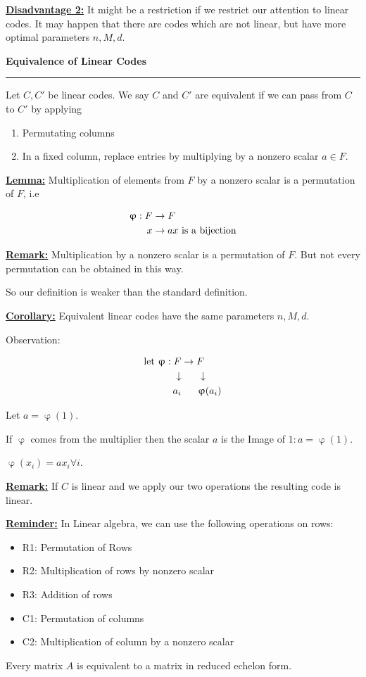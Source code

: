 \documentclass{article}
\newcommand{\header}[1]{
	\begin{Large}
	\noindent\textbf{#1}
	\vspace{2pt}
	\hrule
	\vspace{16pt}
	\end{Large}
	\normalsize
}
\renewcommand{\b}[1]{\textbf{#1}}
\newcommand{\ul}[1]{\underline{#1}}
\renewcommand{\aligned}[1]{
	\begin{align*}
		#1
	\end{align*}
}
\newcommand{\newdef}[2]{\b{\ul{#1:}} #2}
\begin{document}
\newdef{Disadvantage 2}{
	It might be a restriction if we restrict our attention to linear codes.
	It may happen that there are codes which are not linear, but have more
	optimal parameters $n, M, d$.
}

\header{Equivalence of Linear Codes}

Let $C, C'$ be linear codes. We say $C$ and $C'$ are equivalent if we can pass
from $C$ to $C'$ by applying
\begin{enumerate}
	\item Permutating columns
	\item In a fixed column, replace entries by multiplying by a nonzero
	      scalar $a \in F$.
\end{enumerate}

\newdef{Lemma}{
	Multiplication of elements from $F$ by a nonzero scalar is a
	permutation of $F$, i.e
	\aligned{
		\upvarphi: F & \rightarrow F                               \\
		x            & \rightarrow ax \textnormal{ is a bijection} \\
	}
}

\newdef{Remark}{
	Multiplication by a nonzero scalar is a permutation of $F$. But not
	every permutation can be obtained in this way.

	So our definition is weaker than the standard definition.
}

\newdef{Corollary}{
	Equivalent linear codes have the same parameters $n, M, d$.

	Observation:
	\aligned{
		\textnormal{let } \upvarphi: F & \rightarrow F               \\
		\downarrow                     & \hspace{17pt}\downarrow     \\
		a_i                            & \hspace{17pt}\upvarphi(a_i)
	}
	Let $a = \upvarphi(1)$.

	If $\upvarphi$ comes from the multiplier then the scalar $a$ is the
	Image of $1: a = \upvarphi(1)$.

	$\upvarphi(x_i) = ax_i \forall i$.
}

\newdef{Remark}{
	If $C$ is linear and we apply our two operations the resulting code is
	linear.
}

\newdef{Reminder}{
	In Linear algebra, we can use the following operations on rows:
	\begin{itemize}
		\item R1: Permutation of Rows
		\item R2: Multiplication of rows by nonzero scalar
		\item R3: Addition of rows
		\item C1: Permutation of columns
		\item C2: Multiplication of column by a nonzero scalar
	\end{itemize}

	Every matrix $A$ is equivalent to a matrix in reduced echelon form.
}
\end{document}
